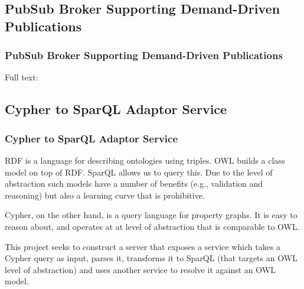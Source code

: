 \subsection{PubSub Broker Supporting Demand-Driven Publications}
\begin{frame}
    \frametitle{PubSub Broker Supporting Demand-Driven Publications}
    \vspace{0mm}
    

    \vspace{3mm}
    Full text: 
\end{frame}

\subsection{Cypher to SparQL Adaptor Service}
\begin{frame}
    \frametitle{Cypher to SparQL Adaptor Service}
    \vspace{0mm}
    RDF is a language for describing ontologies using triples. OWL builds a class model on top of RDF. SparQL allows us to query this. Due to the level of abstraction such models have a number of benefits (e.g., validation and reasoning) but also a learning curve that is prohibitive.
    
    \vspace{3mm}
    Cypher, on the other hand, is a query language for property graphs. It is easy to reason about, and operates at at level of abstraction that is comparable to OWL.
    
    \vspace{3mm}
    This project seeks to construct a server that exposes a service which takes a Cypher query as input, parses it, transforms it to SparQL (that targets an OWL level of abstraction) and uses another service to resolve it against an OWL model.
\end{frame}


